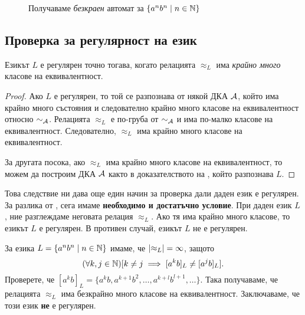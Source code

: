 \begin{example}
\begin{figure}[H]
    \caption{Получаваме {\em безкраен} автомат за $\{a^nb^n \mid n \in \mathbb{N}\}$}
  \end{figure}    
\end{example}

\subsection{Проверка за регулярност на език}

\begin{framed}
  \begin{prop}
    Езикът $L$ е регулярен точно тогава, когато релацията $\approx_L$ има {\em крайно много} класове на еквивалентност.
  \end{prop}
\end{framed}
\begin{proof}
  Ако $L$ е регулярен, то той се разпознава от някой ДКА $\mathcal{A}$, който има крайно много състояния 
  и следователно крайно много класове на еквивалентност относно $\sim_{\mathcal{A}}$.
  Релацията $\approx_L$ е по-груба от $\sim_{\mathcal{A}}$ и има по-малко класове на еквивалентност.
  Следователно, $\approx_L$ има крайно много класове на еквивалентност.
  
  За другата посока, ако $\approx_L$ има крайно много класове на еквивалентност, то можем да 
  построим ДКА $\mathcal{A}$ както в доказателството на , който разпознава $L$.
\end{proof}

Това следствие ни дава още един начин за проверка дали даден език е регулярен.
За разлика от , сега имаме {\bf необходимо и достатъчно условие}.
При даден език $L$, ние разглеждаме неговата релация $\approx_L$.
Ако тя има крайно много класове, то езикът $L$ е регулярен.
В противен случай, езикът $L$ не е регулярен.

\begin{example}
  За езика $L = \{a^nb^n\mid n \in \mathbb{N}\}$ имаме, че $\lvert{\approx_L}\rvert = \infty$,
  защото \[(\forall k,j\in\mathbb{N})[k \neq j \implies [a^kb]_L \neq [a^jb]_L].\]
  Проверете, че $[a^kb]_L = \{a^kb,a^{k+1}b^{2},\dots,a^{k+l}b^{l+1},\dots\}$.
  Така получаваме, че релацията $\approx_L$ има безкрайно много класове на еквивалентност.
  Заключаваме, че този език {\bf не} е регулярен.
\end{example}

